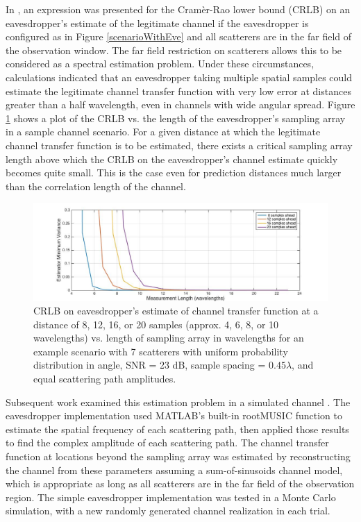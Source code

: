 \documentclass[12pt, titlepage]{article}
\begin{document}
In \cite{kckpVTC2015}, an expression was presented for the Cram\`er-Rao lower bound (CRLB) on an eavesdropper's estimate of the legitimate channel if the eavesdropper is configured as in Figure \ref{scenarioWithEve} and all scatterers are in the far field of the observation window.  The far field restriction on scatterers allows this to be considered as a spectral estimation problem.  Under these circumstances, calculations indicated that an eavesdropper taking multiple spatial samples could estimate the legitimate channel transfer function with very low error at distances greater than a half wavelength, even in channels with wide angular spread.  Figure \ref{CRLB_vs_measLength} shows a plot of the CRLB vs. the length of the eavesdropper's sampling array in a sample channel scenario.  For a given distance at which the legitimate channel transfer function is to be estimated, there exists a critical sampling array length above which the CRLB on the eavesdropper's channel estimate quickly becomes quite small.  This is the case even for prediction distances much larger than the correlation length of the channel.
\begin{figure}
\begin{center}
\includegraphics[width=\textwidth]{CRLB_vs_measLen}
\caption{CRLB on eavesdropper's estimate of channel transfer function at a distance of 8, 12, 16, or 20 samples (approx. 4, 6, 8, or 10 wavelengths) vs. length of sampling array in wavelengths for an example scenario with 7 scatterers with uniform probability distribution in angle, SNR = 23 dB, sample spacing = $0.45 \lambda$, and equal scattering path amplitudes.}\label{CRLB_vs_measLength}
\end{center}
\end{figure}

Subsequent work examined this estimation problem in a simulated channel \cite{brown2015}.  The eavesdropper implementation used MATLAB's built-in rootMUSIC function to estimate the spatial frequency of each scattering path, then applied those results to find the complex amplitude of each scattering path.  The channel transfer function at locations beyond the sampling array was estimated by reconstructing the channel from these parameters assuming a sum-of-sinusoids channel model, which is appropriate as long as all scatterers are in the far field of the observation region.  The simple eavesdropper implementation was tested in a Monte Carlo simulation, with a new randomly generated channel realization in each trial.  
\end{document}

